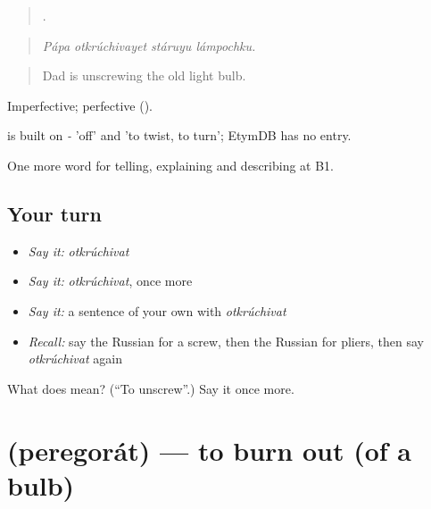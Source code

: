 \begin{quote}
   .
\end{quote}

\begin{quote}
\emph{Pápa otkrúchivayet stáruyu lámpochku.}
\end{quote}

\begin{quote}
Dad is unscrewing the old light bulb.
\end{quote}

Imperfective; perfective  ().

\begin{cousinweb}
\emph{} is built on \emph{-} 'off' and \emph{} 'to twist, to turn'; EtymDB has no entry.
\end{cousinweb}

\begin{grammarlens}[title={What you've built}]
One more word for telling, explaining and describing at B1.
\end{grammarlens}

\subsection*{Your turn}
\begin{itemize}
\raggedright
  \item \emph{Say it:} \emph{otkrúchivat}
  \item \emph{Say it:} \emph{otkrúchivat}, once more
  \item \emph{Say it:} a sentence of your own with \emph{otkrúchivat}
  \item \emph{Recall:} say the Russian for a screw, then the Russian for pliers, then say \emph{otkrúchivat} again
\end{itemize}

\begin{tcolorbox}[breakable,colback=teal!4,colframe=teal!35!black,title={Before you move on}]
What does  mean? (\textquotedblleft{}To unscrew\textquotedblright{}.) Say it once more.
\end{tcolorbox}
\section[\texorpdfstring{\ru{перегорать} (peregorát)}{перегорать (peregorát)}]{ (peregorát) — to burn out (of a bulb)}

